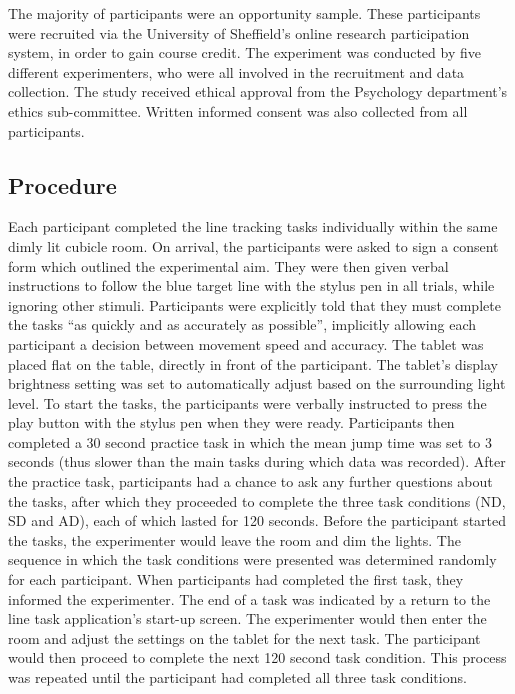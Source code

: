 \documentclass[10pt,letterpaper]{article}
\begin{document}
The majority of participants were an opportunity sample. These
participants were recruited via the University of Sheffield's online
research participation system, in order to gain course credit.  The
experiment was conducted by five different experimenters, who were all
involved in the recruitment and data collection. The study received
ethical approval from the Psychology department's ethics
sub-committee. Written informed consent was also collected from all
participants.

\subsection*{Procedure}
Each participant completed the line tracking tasks individually within
the same dimly lit cubicle room.
On arrival, the participants were asked to sign a consent form which
outlined the experimental aim. They were then given verbal
instructions to follow the blue target line with the stylus pen in all
trials, while ignoring other stimuli. Participants were explicitly
told that they must complete the tasks ``as quickly and as accurately
as possible'', implicitly allowing each participant a decision
between movement speed and accuracy.
%
The tablet was placed
flat on the table, directly in front of the participant. The tablet's
display brightness setting was set to automatically adjust based on
the surrounding light level. To start the tasks, the participants were
verbally instructed to press the play button with the stylus pen when
they were ready. Participants then completed a 30 second practice
%
task in which the mean jump time was set to 3 seconds (thus slower
than the main tasks during which data was recorded). After the
practice task, participants had a chance to ask any further questions
about the tasks, after which they proceeded to complete the three task
conditions (ND, SD and AD), each of which lasted for 120
seconds. Before the participant started the tasks, the experimenter
would leave the room and dim the lights.
The sequence in which the task conditions were presented was
determined randomly for each participant. When participants had
completed the first task, they informed the experimenter. The end of a
task was indicated by a return to the line task application's start-up
screen. The experimenter would then enter the room and adjust the
settings on the tablet for the next task. The participant would then
proceed to complete the next 120 second task condition. This process
was repeated until the participant had completed all three task
conditions.
\end{document}
